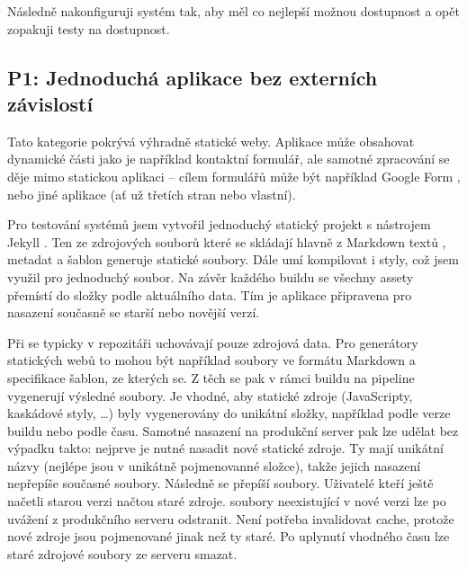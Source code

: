         Následně nakonfiguruji systém tak, aby měl co nejlepší možnou dostupnost a opět zopakuji testy na dostupnost.
        \blind[4]


        \subsection{P1: Jednoduchá aplikace bez externích závislostí}
            Tato kategorie pokrývá výhradně statické weby. Aplikace může obsahovat dynamické části jako je například kontaktní formulář, ale samotné zpracování se děje mimo statickou aplikaci -- cílem formulářů může být například Google Form \cite{mccoy-google-form}, nebo jiné aplikace (ať už třetích stran nebo vlastní).

            Pro testování \CICD systémů jsem vytvořil jednoduchý statický projekt s nástrojem Jekyll \cite{jekyll}. Ten ze zdrojových souborů které se skládají hlavně z Markdown textů \cite{markdown}, metadat a šablon generuje statické \HTML soubory. Dále umí kompilovat i styly, což jsem využil pro jednoduchý  soubor. Na závěr každého buildu se všechny assety přemístí do složky podle aktuálního data. Tím je aplikace připravena pro nasazení současně se starší nebo novější verzí.


            Při \CICD se typicky v repozitáři uchovávají pouze zdrojová data. Pro generátory statických webů to mohou být například soubory ve formátu Markdown a specifikace \HTML šablon, ze kterých se. Z těch se pak v rámci buildu na \CICD pipeline vygenerují výsledné \HTML soubory. Je vhodné, aby statické zdroje (JavaScripty, kaskádové styly, \ldots) byly vygenerovány do unikátní složky, například podle verze buildu nebo podle času. Samotné nasazení na produkční server pak lze udělat bez výpadku takto: nejprve je nutné nasadit nové statické zdroje. Ty mají unikátní názvy (nejlépe jsou v unikátně pojmenovanné složce), takže jejich nasazení nepřepíše současné soubory. Následně se přepíší \HTML soubory. Uživatelé kteří ještě načetli starou verzi načtou staré zdroje. \HTML soubory neexistující v nové verzi lze po uvážení z produkčního serveru odstranit. Není potřeba invalidovat cache, protože nové zdroje jsou pojmenované jinak než ty staré. Po uplynutí vhodného času lze staré zdrojové soubory ze serveru smazat.

